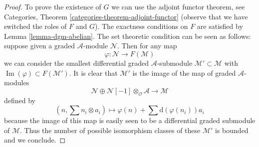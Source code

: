 \documentclass[10pt,a4paper]{amsart}
\theoremstyle{plain}
\theoremstyle{definition}
\theoremstyle{remark}
\numberwithin{equation}{subsection}
\def\Im{\mathop{\mathrm{Im}}}
\begin{document}
\begin{proof}
To prove the existence of $G$ we can use the adjoint functor theorem, see
Categories, Theorem \ref{categories-theorem-adjoint-functor} (observe that
we have switched the roles of $F$ and $G$). The exactness conditions on
$F$ are satisfied by Lemma \ref{lemma-dgm-abelian}. The set theoretic
condition can be seen as follows: suppose given a graded $\mathcal{A}$-module
$\mathcal{N}$. Then for any map
$$
\varphi : \mathcal{N} \longrightarrow F(\mathcal{M})
$$
we can consider the smallest differential graded $\mathcal{A}$-submodule
$\mathcal{M}' \subset \mathcal{M}$ with
$\Im(\varphi) \subset F(\mathcal{M}')$.
It is clear that $\mathcal{M}'$ is the image of the map
of graded $\mathcal{A}$-modules
$$
\mathcal{N} \oplus
\mathcal{N}[-1] \otimes_\mathcal{O} \mathcal{A}
\longrightarrow
\mathcal{M}
$$
defined by
$$
(n, \sum n_i \otimes a_i) \longmapsto
\varphi(n) + \sum \text{d}(\varphi(n_i)) a_i
$$
because the image of this map is easily seen to be a differential graded
submodule of $\mathcal{M}$.
Thus the number of possible isomorphism classes of these $\mathcal{M}'$
is bounded and we conclude.
\end{proof}
\end{document}
